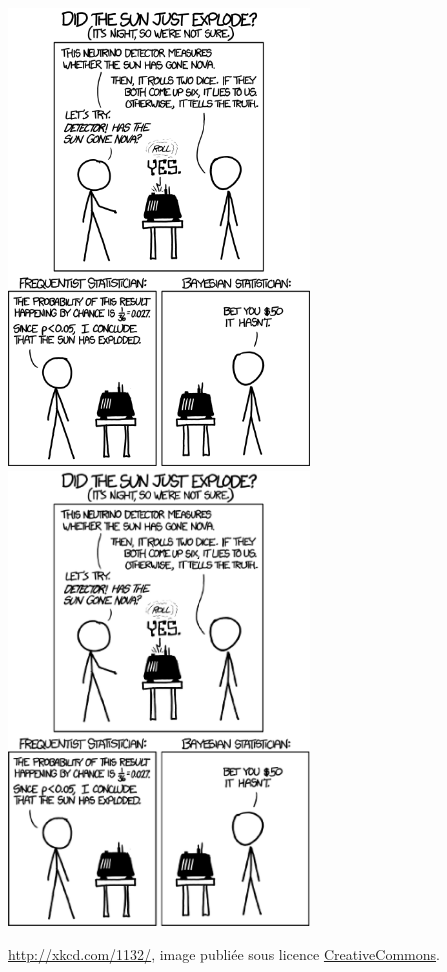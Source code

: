 

\begin{center}

           \ifpdf
            \includegraphics[width=8cm]{frequentists_vs_bayesians.png}
        \else
            \includegraphics[width=8cm]{frequentists_vs_bayesians.eps}

            \fi

            \url{http://xkcd.com/1132/}, image publiée sous licence \href{http://xkcd.com/license.html}{CreativeCommons}.

\end{center}


